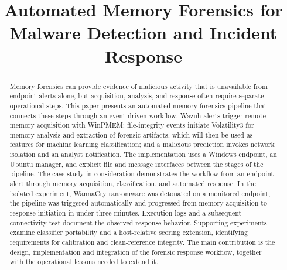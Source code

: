 \documentclass[conference]{IEEEtran}
\begin{document}
\title{Automated Memory Forensics for\\
Malware Detection and Incident Response}

\author{
\and
{}
\and
{}
}

\maketitle

\begin{abstract}
Memory forensics can provide evidence of malicious activity that is unavailable from endpoint alerts alone, but acquisition, analysis, and response often require separate operational steps. This paper presents an automated memory-forensics pipeline that connects these steps through an event-driven workflow. Wazuh alerts trigger remote memory acquisition with WinPMEM; file-integrity events initiate Volatility3 for memory analysis and extraction of forensic artifacts, which will then be used as features for machine learning classification; and a malicious prediction invokes network isolation and an analyst notification. The implementation uses a Windows endpoint, an Ubuntu manager, and explicit file and message interfaces between the stages of the pipeline. The case study in consideration demonstrates the workflow from an endpoint alert through memory acquisition, classification, and automated response. In the isolated experiment, WannaCry ransomware was detonated on a monitored endpoint, the pipeline was triggered automatically and progressed from memory acquisition to response initiation in under three minutes. Execution logs and a subsequent connectivity test document the observed response behavior. Supporting experiments examine classifier portability and a host-relative scoring extension, identifying requirements for calibration and clean-reference integrity. The main contribution is the design, implementation and integration of the forensic response workflow, together with the operational lessons needed to extend it.
\end{abstract}
\end{document}
